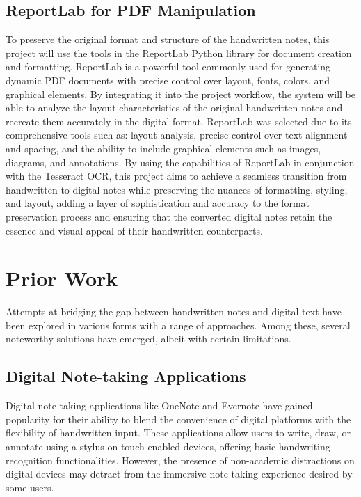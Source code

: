 \documentclass[10pt,twocolumn]{article}
\begin{document}
\subsection{ReportLab for PDF Manipulation}
To preserve the original format and structure of the handwritten notes, this project will use the tools in the ReportLab Python library for document creation and formatting. ReportLab is a powerful tool commonly used for generating dynamic PDF documents with precise control over layout, fonts, colors, and graphical elements. By integrating it  into the project workflow, the system will be able to analyze the layout characteristics of the original handwritten notes and recreate them accurately in the digital format. ReportLab was selected due to its comprehensive tools  such as: layout analysis, precise control over text alignment and spacing, and the ability to include graphical elements such as images, diagrams, and annotations. By using the capabilities of ReportLab in conjunction with the Tesseract OCR, this project aims to achieve a seamless transition from handwritten to digital notes while preserving the nuances of formatting, styling, and layout, adding a layer of sophistication and accuracy to the format preservation process and ensuring that the converted digital notes retain the essence and visual appeal of their handwritten counterparts.



\section{Prior Work}
Attempts at bridging the gap between handwritten notes and digital text have been explored in various forms with a range of approaches. Among these, several noteworthy solutions have emerged, albeit with certain limitations.

\subsection{Digital Note-taking Applications}
Digital note-taking applications like OneNote and Evernote have gained popularity for their ability to blend the convenience of digital platforms with the flexibility of handwritten input. These applications allow users to write, draw, or annotate using a stylus on touch-enabled devices, offering basic handwriting recognition functionalities. However, the presence of non-academic distractions on digital devices may detract from the immersive note-taking experience desired by some users.
\end{document}

